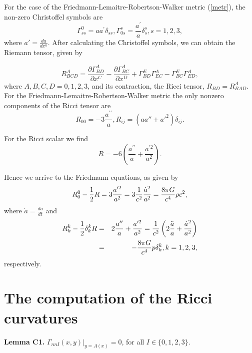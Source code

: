 \documentclass[aps,superscriptaddress, showpacs,preprintnumbers, superscriptaddress, nofootinbibt,twocolumn]{revtex4-2}
\def\bea{\begin{eqnarray}}
\def\eea{\end{eqnarray}}
\begin{document}
For the case of the Friedmann-Lemaitre-Robertson-Walker metric (\ref{metr}),
the non-zero Christoffel symbols are
\begin{equation}
\Gamma _{ss}^{0}=aa^{\prime }\delta _{ss},\Gamma _{0s}^{s}=\frac{a^{\prime }}{a}\delta_s^s,s=1,2,3,
\end{equation}
where $a'=\frac{da}{dx^0}.$
After calculating the Christoffel symbols, we can obtain the Riemann tensor,
given by

\begin{equation}
R^A_{BCD}=\dfrac{\partial \Gamma^A_{BD}}{\partial x^C}-
    \dfrac{\partial \Gamma^A_{BC}}{\partial x^D}+\Gamma^E_{BD}\Gamma^A_{EC}
    -\Gamma^E_{BC}\Gamma^A_{ED},
    \end{equation}
where $A,B,C,D=0,1,2,3$,
and its contraction, the Ricci tensor, $R_{BD}=R_{BAD}^{A}$. For the
Friedmann-Lemaitre-Robertson-Walker metric the only nonzero components of
the Ricci tensor are
\begin{equation}
R_{00}=-3\frac{a^{\prime \prime }}{a}
,R_{ij}=\left(aa''+a'^2\right)\delta _{ij}.
\end{equation}

For the Ricci scalar we find
\begin{equation}
R=-6\left( \frac{a^{\prime \prime }}{a}+\frac{a^{\prime 2}}{a^{2}}\right) .
\end{equation}

Hence we arrive to the Friedmann equations, as given by
\begin{equation}
R_{0}^{0}-\frac{1}{2}R=3\frac{a^{\prime 2}}{a^{2}}=3\frac{1}{c^{2}}\frac{%
\dot{a}^{2}}{a^{2}}=\frac{8\pi G}{c^{4}}\rho c^{2},
\end{equation}
where $\dot{a}=\frac{da}{dt}$
and
\bea
R_{k}^{k}-\frac{1}{2}\delta _{k}^{k}R&=&2\frac{a^{\prime \prime }}{a}+\frac{%
a^{\prime 2}}{a^{2}}=\frac{1}{c^{2}}\left( 2\frac{\ddot{a}}{a}+\frac{\dot{a}%
^{2}}{a^{2}}\right) \nonumber\\
&=&-\frac{8\pi G}{c^{4}}p\delta _k^k, k=1,2,3,
\eea
respectively.



\section{The computation of the Ricci curvatures}\label{appc}

{\bf Lemma C1.}
$\Gamma_{nnI}(x,y)|_{y=A(x)}=0$, for all $I\in \{0,1,2,3\}.$

\smallskip
\end{document}
